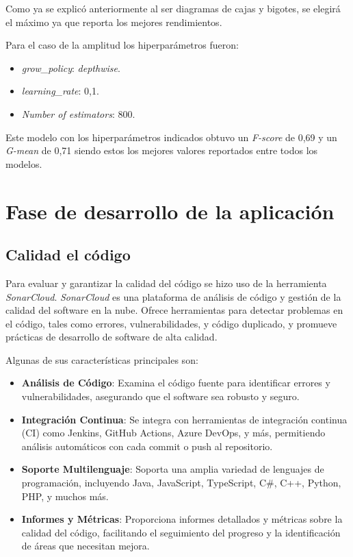 Como ya se explicó anteriormente al ser diagramas de cajas y bigotes, se elegirá el máximo ya que reporta los mejores rendimientos.

Para el caso de la amplitud los hiperparámetros fueron:
\begin{itemize}
\item \textit{grow\_policy}: \textit{depthwise}.
\item \textit{learning\_rate}: 0,1.
\item \textit{Number of estimators}: 800.
\end{itemize}
Este modelo con los hiperparámetros indicados obtuvo un \textit{F-score} de 0,69 y un \textit{G-mean} de 0,71 siendo estos los mejores valores reportados entre todos los modelos.

\section{Fase de desarrollo de la aplicación}
\label{Fase de desarrollo de la aplicación}
\subsection{Calidad el código}
Para evaluar y garantizar la calidad del código se hizo uso de la herramienta \textit{SonarCloud}. \textit{SonarCloud} es una plataforma de análisis de código y gestión de la calidad del software en la nube. Ofrece herramientas para detectar problemas en el código, tales como errores, vulnerabilidades, y código duplicado, y promueve prácticas de desarrollo de software de alta calidad.

Algunas de sus características principales son:
\begin{itemize}

\item \textbf{Análisis de Código}: Examina el código fuente para identificar errores y vulnerabilidades, asegurando que el software sea robusto y seguro.

\item \textbf{Integración Continua}: Se integra con herramientas de integración continua (CI) como Jenkins, GitHub Actions, Azure DevOps, y más, permitiendo análisis automáticos con cada commit o push al repositorio.

\item \textbf{Soporte Multilenguaje}: Soporta una amplia variedad de lenguajes de programación, incluyendo Java, JavaScript, TypeScript, C\#, C++, Python, PHP, y muchos más.

\item \textbf{Informes y Métricas}: Proporciona informes detallados y métricas sobre la calidad del código, facilitando el seguimiento del progreso y la identificación de áreas que necesitan mejora.
\end{itemize}

